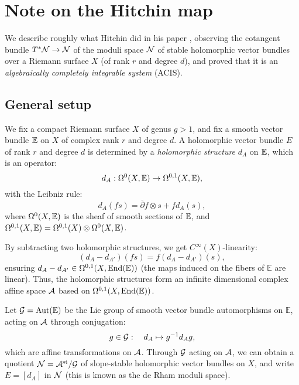\section{Note on the Hitchin map}
We describe roughly what Hitchin did in his paper \cite{hitch}, observing the cotangent bundle $T^*\mathcal{N}\rightarrow\mathcal{N}$ of the moduli space $\mathcal{N}$ of stable holomorphic vector bundles over a Riemann surface $X$ (of rank $r$ and degree $d$), and proved that it is an \textit{algebraically completely integrable system} (ACIS).


\subsection{General setup}

We fix a compact Riemann surface $X$ of genus $g>1$, and fix a smooth vector bundle $\mathbb{E}$ on $X$ of complex rank $r$ and degree $d$. A holomorphic vector bundle $E$ of rank $r$ and degree $d$ is determined by a \textit{holomorphic structure} $d_A$ on $\mathbb{E}$, which is an operator:
\begin{equation}
    d_A:\Omega^0(X,\mathbb{E})\rightarrow\Omega^{0,1}(X,\mathbb{E}),
\end{equation}
with the Leibniz rule:
\begin{equation}
    d_A(fs)=\overline{\partial}f\otimes s+fd_A(s),
\end{equation}
where $\Omega^0(X,\mathbb{E})$ is the sheaf of smooth sections of $\mathbb{E}$, and $\Omega^{0,1}(X,\mathbb{E})=\Omega^{0,1}(X)\otimes \Omega^0(X,\mathbb{E})$.

By subtracting two holomorphic structures, we get $C^\infty(X)$-linearity:
\begin{equation}
    (d_A-d_{A'})(fs)=f(d_A-d_{A'})(s),
\end{equation}
ensuring $d_A-d_{A'}\in\Omega^{0,1}(X,\text{End}(\mathbb{E}))$ (the maps induced on the fibers of $\mathbb{E}$ are linear). Thus, the holomorphic structures form an infinite dimensional complex affine space $\mathcal{A}$ based on $\Omega^{0,1}(X,\text{End}(\mathbb{E}))$.

Let $\mathcal{G}=\text{Aut}(\mathbb{E})$ be the Lie group of smooth vector bundle automorphisms on $\mathbb{E}$, acting on $\mathcal{A}$ through conjugation:
\begin{equation}
    g\in\mathcal{G}:\quad d_A\mapsto g^{-1}d_A g,
\end{equation}
which are affine transformations on $\mathcal{A}$. Through $\mathcal{G}$ acting on $\mathcal{A}$, we can obtain a quotient $\mathcal{N}=\mathcal{A}^{\text{st}}/\mathcal{G}$ of slope-stable holomorphic vector bundles on $X$, and write $E=[d_A]$ in $\mathcal{N}$ (this is known as the de Rham moduli space).

